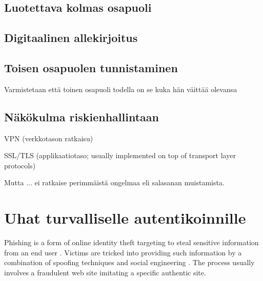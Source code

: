 \documentclass[english,gradu]{tktltiki}
\begin{document}


\subsection{Luotettava kolmas osapuoli} %
\label{sub:luotettava_kolmas_osapuoli}


\subsection{Digitaalinen allekirjoitus} %
\label{sub:digitaalinen_allekirjoitus}


\subsection{Toisen osapuolen tunnistaminen} %
\label{sub:toisen_osapuolen_tunnistaminen}
Varmistetaan että toinen osapuoli todella on se kuka hän väittää olevansa


\subsection{Näkökulma riskienhallintaan} %
\label{sub:näkökulma_riskienhallintaan}
VPN (verkkotason ratkaisu)

SSL/TLS (applikaatiotaso; usually implemented on top of transport layer protocols)

Mutta ... ei ratkaise perimmäistä ongelmaa eli salasanan muistamista.



\section{Uhat turvalliselle autentikoinnille} %
\label{sec:uhat_turvalliselle_autentikoinnille}

    Phishing is a form of online identity theft targeting to steal sensitive information from an end user   \cite{phishing_attacks_and_solutions_2007, why_phishing_works_06, suspectibility_to_phishing_2006}. Victims are tricked into providing such information by a combination of spoofing techniques and social engineering \cite{visual_similarity_phishing_2008}. The process usually involves a fraudulent web site imitating a specific authentic site.
\end{document}
